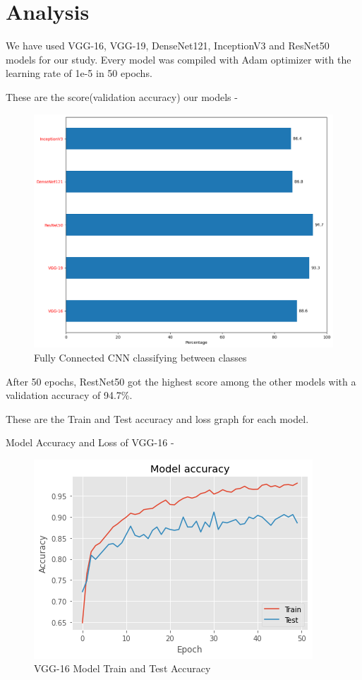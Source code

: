 \section{Analysis}
We have used VGG-16, VGG-19, DenseNet121, InceptionV3 and ResNet50 models for our study. Every model was compiled with Adam optimizer with the learning rate of 1e-5 in 50 epochs. 

These are the score(validation accuracy) our models - 

\vspace{5mm}
\begin{figure}[hbt!]
\centering
\includegraphics[scale=0.5]{images/fig-24.png}
\caption{Fully Connected CNN classifying between classes}
\label{fig:x Fully Connected CNN classifying between classes.}
\end{figure}

After 50 epochs, RestNet50 got the highest score among the other models with a validation accuracy of 94.7\%.

\vspace{5mm}
These are the Train and Test accuracy and loss graph for each model.

\newpage
\vspace{5mm}
Model Accuracy and Loss of VGG-16 -

\vspace{5mm}
\begin{figure}[hbt!]
\centering
\includegraphics[scale=1]{images/fig-25.png}
\caption{VGG-16 Model Train and Test Accuracy}
\label{fig:x VGG-16 Model Train and Test Accuracy}
\end{figure}

